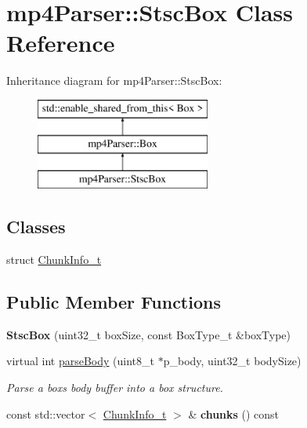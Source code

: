 \hypertarget{classmp4_parser_1_1_stsc_box}{}\section{mp4\+Parser\+::Stsc\+Box Class Reference}
\label{classmp4_parser_1_1_stsc_box}
Inheritance diagram for mp4\+Parser\+::Stsc\+Box\+:\begin{figure}[H]
\begin{center}
\leavevmode
\includegraphics[height=3.000000cm]{classmp4_parser_1_1_stsc_box}
\end{center}
\end{figure}
\subsection*{Classes}
\begin{DoxyCompactItemize}
\item 
struct \mbox{\hyperlink{structmp4_parser_1_1_stsc_box_1_1_chunk_info__t}{Chunk\+Info\+\_\+t}}
\end{DoxyCompactItemize}
\subsection*{Public Member Functions}
\begin{DoxyCompactItemize}
\item 
\mbox{\label{classmp4_parser_1_1_stsc_box_a2f3881e77ac7f517422de99e2d397b32}} 
{\bfseries Stsc\+Box} (uint32\+\_\+t box\+Size, const Box\+Type\+\_\+t \&box\+Type)
\item 
virtual int \mbox{\hyperlink{classmp4_parser_1_1_stsc_box_a0f63518f8cef06e41b43b2d527a986ca}{parse\+Body}} (uint8\+\_\+t $\ast$p\+\_\+body, uint32\+\_\+t body\+Size)
\begin{DoxyCompactList}\small\item\em Parse a box\textquotesingle{}s body buffer into a box structure. \end{DoxyCompactList}\item 
\mbox{\label{classmp4_parser_1_1_stsc_box_aa8e577aa5b8cfc83f42fefdd6da488e0}} 
const std\+::vector$<$ \mbox{\hyperlink{structmp4_parser_1_1_stsc_box_1_1_chunk_info__t}{Chunk\+Info\+\_\+t}} $>$ \& {\bfseries chunks} () const
\end{DoxyCompactItemize}
